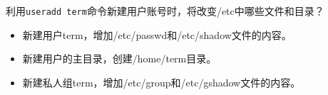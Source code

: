 \question[10] 利用\verb|useradd term|命令新建用户账号时，将改变/etc中哪些文件和目录？

\vspace*{5cm}

\begin{solution}
\begin{itemize}
  \item 新建用户term，增加/etc/passwd和/etc/shadow文件的内容。
  \item 新建用户的主目录，创建/home/term目录。
  \item 新建私人组term，增加/etc/group和/etc/gshadow文件的内容。
\end{itemize}
\end{solution}
